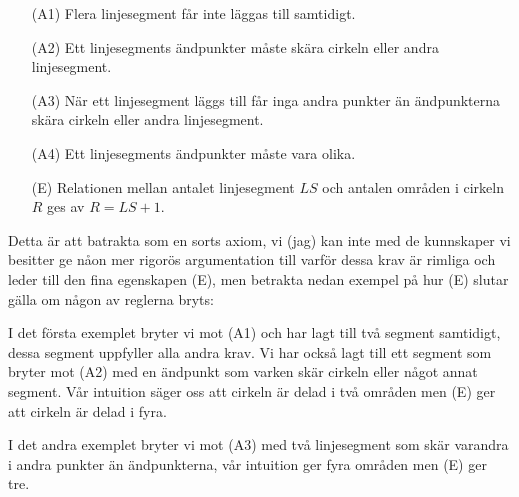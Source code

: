 \documentclass{article}
\begin{document}
\begin{itemize}
  \item[(A1)] Flera linjesegment får inte läggas till samtidigt.
  \item[(A2)] Ett linjesegments ändpunkter måste skära cirkeln eller andra linjesegment.
  \item[(A3)] När ett linjesegment läggs till får inga andra punkter än ändpunkterna skära cirkeln eller andra linjesegment.
  \item[(A4)] Ett linjesegments ändpunkter måste vara olika.
  \item[(E)] Relationen mellan antalet linjesegment $LS$ och antalen områden i cirkeln $R$ ges av $R = LS + 1$.
\end{itemize}

Detta är att batrakta som en sorts axiom, vi (jag) kan inte med de kunnskaper vi besitter ge nåon mer rigorös argumentation till varför dessa krav är rimliga och leder till den fina egenskapen (E), men betrakta nedan exempel på hur (E) slutar gälla om någon av reglerna bryts:

\begin{center}
\end{center}


I det första exemplet bryter vi mot (A1) och har lagt till två segment samtidigt, dessa segment uppfyller alla andra krav. Vi har också lagt till ett segment som bryter mot (A2) med en ändpunkt som varken skär cirkeln eller något annat segment. Vår intuition säger oss att cirkeln är delad i två områden men (E) ger att cirkeln är delad i fyra.

I det andra exemplet bryter vi mot (A3) med två linjesegment som skär varandra i andra punkter än ändpunkterna, vår intuition ger fyra områden men (E) ger tre.
\end{document}
